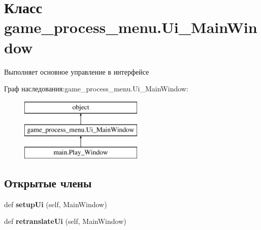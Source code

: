 \hypertarget{classgame__process__menu_1_1_ui___main_window}{}\section{Класс game\+\_\+process\+\_\+menu.\+Ui\+\_\+\+Main\+Window}
\label{classgame__process__menu_1_1_ui___main_window}


Выполняет основное управление в интерфейсе  


Граф наследования\+:game\+\_\+process\+\_\+menu.\+Ui\+\_\+\+Main\+Window\+:\begin{figure}[H]
\begin{center}
\leavevmode
\includegraphics[height=3.000000cm]{classgame__process__menu_1_1_ui___main_window}
\end{center}
\end{figure}
\subsection*{Открытые члены}
\begin{DoxyCompactItemize}
\item 
\mbox{\label{classgame__process__menu_1_1_ui___main_window_ace7f15254d19aa7b9b8823314a39353b}} 
def {\bfseries setup\+Ui} (self, Main\+Window)
\item 
\mbox{\label{classgame__process__menu_1_1_ui___main_window_aa85a12e6d10322dfc7a6ace29d3844d4}} 
def {\bfseries retranslate\+Ui} (self, Main\+Window)
\end{DoxyCompactItemize}
